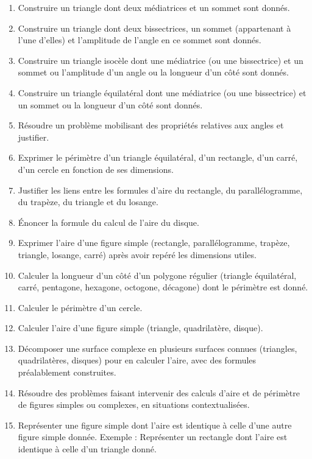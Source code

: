 \documentclass[../../syllabus_1.tex]{subfiles}
\begin{document}
\begin{enumerate}[label=\textbf{\arabic*.}]
    \item Construire un triangle dont deux médiatrices et un sommet sont donnés.
    \item Construire un triangle dont deux bissectrices, un sommet (appartenant à l'une d'elles) et l'amplitude de l'angle en ce sommet sont donnés.
    \item Construire un triangle isocèle dont une médiatrice (ou une bissectrice) et un sommet ou l'amplitude d'un angle ou la longueur d'un côté sont donnés.
    \item Construire un triangle équilatéral dont une médiatrice (ou une bissectrice) et un sommet ou la longueur d'un côté sont donnés.
    \item Résoudre un problème mobilisant des propriétés relatives aux angles et justifier.
    \item Exprimer le périmètre d'un triangle équilatéral, d'un rectangle, d'un carré, d'un cercle en fonction de ses dimensions.
    \item Justifier les liens entre les formules d'aire du rectangle, du parallélogramme, du trapèze, du triangle et du losange.
    \item Énoncer la formule du calcul de l'aire du disque.
    \item Exprimer l'aire d'une figure simple (rectangle, parallélogramme, trapèze, triangle, losange, carré) après avoir repéré les dimensions utiles.
    \item Calculer la longueur d'un côté d'un polygone régulier (triangle équilatéral, carré, pentagone, hexagone, octogone, décagone) dont le périmètre est donné.
    \item Calculer le périmètre d'un cercle.
    \item Calculer l'aire d'une figure simple (triangle, quadrilatère, disque).
    \item Décomposer une surface complexe en plusieurs surfaces connues (triangles, quadrilatères, disques) pour en calculer l'aire, avec des formules préalablement construites.
    \item Résoudre des problèmes faisant intervenir des calculs d'aire et de périmètre de figures simples ou complexes, en situations contextualisées.
    \item Représenter une figure simple dont l'aire est identique à celle d'une autre figure simple donnée. Exemple : Représenter un rectangle dont l'aire est identique à celle d'un triangle donné.
\end{enumerate}
\end{document}
